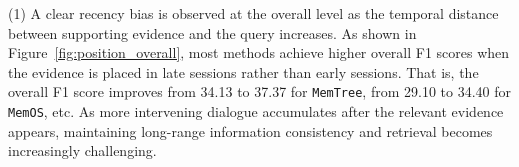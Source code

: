 

(1) A clear recency bias is observed at the overall level as the temporal distance between supporting evidence and the query increases. As shown in Figure~\ref{fig:position_overall}, most methods achieve higher overall F1 scores when the evidence is placed in late sessions rather than early sessions. That is, the overall F1 score improves from 34.13 to 37.37 for \texttt{MemTree}, from 29.10 to 34.40 for \texttt{MemOS}, etc.
As more intervening dialogue accumulates after the relevant evidence appears, maintaining long-range information consistency and retrieval becomes increasingly challenging. 



